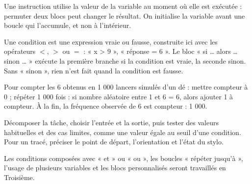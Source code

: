 \begin{attention}Une instruction utilise la valeur de la variable au moment où elle est exécutée : permuter deux blocs peut changer le résultat. On initialise la variable avant une boucle qui l’accumule, et non à l’intérieur.\end{attention}
\clearpage
{}\label{cours-18-2}
\begin{definition}Une condition est une expression vraie ou fausse, construite ici avec les opérateurs $<$, $>$ ou $=$ : « x > 9 », « réponse = 6 ». Le bloc « si … alors … sinon … » exécute la première branche si la condition est vraie, la seconde sinon. Sans « sinon », rien n’est fait quand la condition est fausse.\end{definition}
\begin{exemple}Pour compter les 6 obtenus en 1 000 lancers simulés d’un dé : mettre compteur à 0 ; répéter 1 000 fois : si nombre aléatoire entre 1 et 6 = 6, alors ajouter 1 à compteur. À la fin, la fréquence observée de 6 est compteur : 1 000.\end{exemple}
\begin{savoirfaire}Décomposer la tâche, choisir l’entrée et la sortie, puis tester des valeurs habituelles et des cas limites, comme une valeur égale au seuil d’une condition. Pour un tracé, préciser le point de départ, l’orientation et l’état du stylo.\end{savoirfaire}
\begin{attention}Les conditions composées avec « et » ou « ou », les boucles « répéter jusqu’à », l’usage de plusieurs variables et les blocs personnalisés seront travaillés en Troisième.\end{attention}

